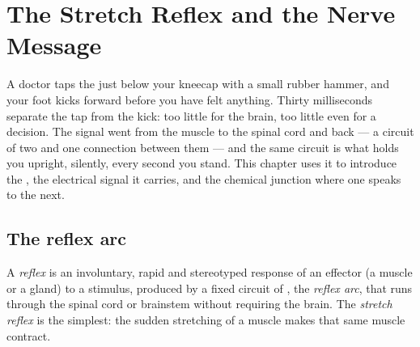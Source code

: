 \chapter{The Stretch Reflex and the Nerve Message}\label{ch:g12:stretch-reflex}

A doctor taps the  just below your kneecap with a small rubber
hammer, and your foot kicks forward before you have felt anything.
Thirty milliseconds separate the tap from the kick: too little for the
brain, too little even for a decision. The signal went from the muscle
to the spinal cord and back --- a circuit of two  and one
connection between them --- and the same circuit is what holds you
upright, silently, every second you stand. This chapter uses it to
introduce the , the electrical signal it carries, and the
chemical junction where one  speaks to the next.

\section{The reflex arc}

\begin{definition}[Reflex]\label{def:g12:stretch-reflex:reflex}
A \emph{reflex} is an involuntary, rapid and
stereotyped response of an effector (a muscle or a gland) to a
stimulus, produced by a fixed circuit of , the
\emph{reflex arc}, that runs through the spinal
cord or brainstem without requiring the brain. The
\emph{stretch reflex} is the simplest: the
sudden stretching of a muscle makes that same muscle contract.
\end{definition}

